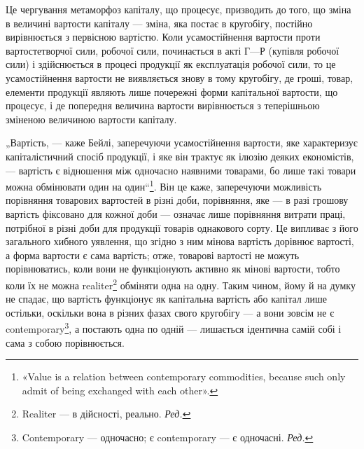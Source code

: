 Це чергування метаморфоз капіталу, що процесує, призводить до
того, що зміна в величині вартости капіталу — зміна, яка постає в кругобігу,
постійно вирівнюється з первісною вартістю. Коли усамостійнення
вартости проти вартостетворчої сили, робочої сили, починається в акті
$Г — Р$ (купівля робочої сили) і здійснюється в процесі продукції як
експлуатація робочої сили, то це усамостійнення вартости не виявляється
знову в тому кругобігу, де гроші, товар, елементи продукції являють
лише почережні форми капітальної вартости, що процесує, і де попередня
величина вартости вирівнюється з теперішньою зміненою величиною
вартости капіталу.

„Вартість, — каже Бейлі, заперечуючи усамостійнення вартости, яке
характеризує капіталістичний спосіб продукції, і яке він трактує як
ілюзію деяких економістів, — вартість є відношення між одночасно наявними
товарами, бо лише такі товари можна обмінювати один на один“\footnote*{
«Value is a relation between contemporary commodities, because such only
admit of being exchanged with each other».
}.
Він це каже, заперечуючи можливість порівняння товарових вартостей в
різні доби, порівняння, яке — в разі грошову вартість фіксовано для
кожної доби — означає лише порівняння витрати праці, потрібної в різні
доби для продукції товарів однакового сорту. Це випливає з його загального
хибного уявлення, що згідно з ним мінова вартість дорівнює
вартості, а форма вартости є сама вартість; отже, товарові вартості не
можуть порівнюватись, коли вони не функціонують активно як мінові вартости,
тобто коли їх не можна realiter\footnote*{
Realiter — в дійсності, реально. \emph{Ред.}
} обміняти одна на одну. Таким
чином, йому й на думку не спадає, що вартість функціонує як капітальна
вартість або капітал лише остільки, оскільки вона в різних фазах свого
кругобігу — а вони зовсім не є contemporary\footnote*{
Contemporary — одночасно; є contemporary — є одночасні. \emph{Ред.}
}, а постають одна по
одній — лишається ідентична самій собі і сама з собою порівнюється.

